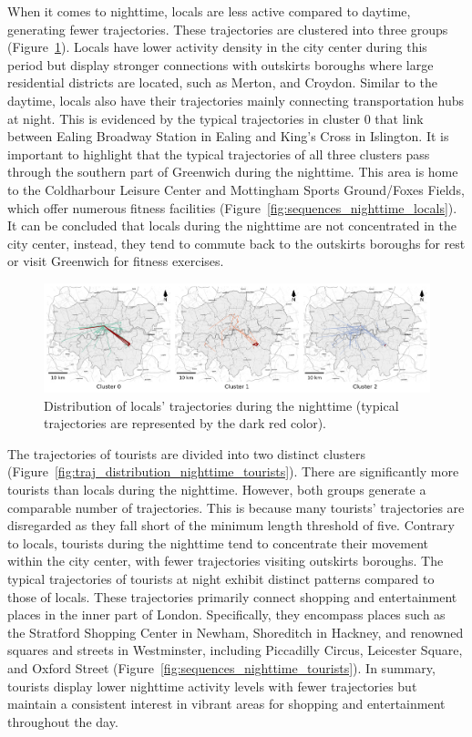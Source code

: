\documentclass{article}
\theoremstyle{remark}
\begin{document}
When it comes to nighttime, locals are less active compared to daytime, generating fewer trajectories. These trajectories are clustered into three groups (Figure~\ref{fig:traj_distribution_nighttime_locals}). Locals have lower activity density in the city center during this period but display stronger connections with outskirts boroughs where large residential districts are located, such as Merton, and Croydon. Similar to the daytime, locals also have their trajectories mainly connecting transportation hubs at night. This is evidenced by the typical trajectories in cluster 0 that link between Ealing Broadway Station in Ealing and King's Cross in Islington. It is important to highlight that the typical trajectories of all three clusters pass through the southern part of Greenwich during the nighttime. This area is home to the Coldharbour Leisure Center and Mottingham Sports Ground/Foxes Fields, which offer numerous fitness facilities (Figure~\ref{fig:sequences_nighttime_locals}). It can be concluded that locals during the nighttime are not concentrated in the city center, instead, they tend to commute back to the outskirts boroughs for rest or visit Greenwich for fitness exercises.

\begin{figure}[!h]
\centering
\includegraphics[width=1\textwidth]{figures/traj_distribution_nighttime_locals.png}
\caption{\label{fig:traj_distribution_nighttime_locals}Distribution of locals' trajectories during the nighttime (typical trajectories are represented by the dark red color).}
\end{figure}


The trajectories of tourists are divided into two distinct clusters (Figure~\ref{fig:traj_distribution_nighttime_tourists}). There are significantly more tourists than locals during the nighttime. However, both groups generate a comparable number of trajectories. This is because many tourists' trajectories are disregarded as they fall short of the minimum length threshold of five. Contrary to locals, tourists during the nighttime tend to concentrate their movement within the city center, with fewer trajectories visiting outskirts boroughs. The typical trajectories of tourists at night exhibit distinct patterns compared to those of locals. These trajectories primarily connect shopping and entertainment places in the inner part of London. Specifically, they encompass places such as the Stratford Shopping Center in Newham, Shoreditch in Hackney, and renowned squares and streets in Westminster, including Piccadilly Circus, Leicester Square, and Oxford Street (Figure~\ref{fig:sequences_nighttime_tourists}). In summary, tourists display lower nighttime activity levels with fewer trajectories but maintain a consistent interest in vibrant areas for shopping and entertainment throughout the day.
\end{document}
